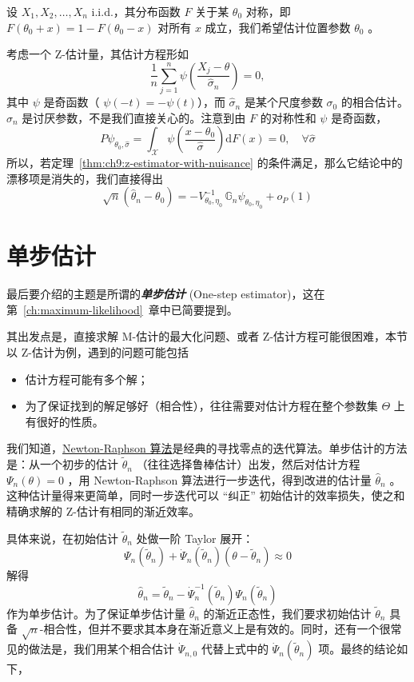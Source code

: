 \begin{example}[对称位置模型]
设 $X_1, X_2, \dots, X_n$ i.i.d.，其分布函数 $F$ 关于某 $\theta_0$ 对称，即 $F(\theta_0 + x) = 1 - F(\theta_0 - x)$ 对所有 $x$ 成立，我们希望估计位置参数 $\theta_0$ 。

考虑一个 Z-估计量，其估计方程形如\[\frac{1}{n} \sum_{j=1}^n \psi\!\left( \frac{X_j - \theta}{\widehat{\sigma}_n} \right) = 0,\]
其中 $\psi$ 是奇函数（ $\psi(-t) = -\psi(t)$），而 $\widehat{\sigma}_n$ 是某个尺度参数 $\sigma_0$ 的相合估计。$\widehat{\sigma}_n$ 是讨厌参数，不是我们直接关心的。注意到由 $F$ 的对称性和 $\psi$ 是奇函数， \[ P\psi_{\theta_0,\widehat\sigma}=\int_{\mathscr X}\psi\left(\frac{x-\theta_0}{\widehat\sigma}\right)\mathrm{d}F(x)=0,\quad \forall \widehat\sigma \]所以，若定理~\ref{thm:ch9:z-estimator-with-nuisance} 的条件满足，那么它结论中的漂移项是消失的，我们直接得出\[\sqrt{n}(\widehat{\theta}_n - \theta_0) = -V_{\theta_0,\eta_0}^{-1}\,\mathbb{G}_n \psi_{\theta_0,\eta_0} + o_P(1)\]

\end{example}

\section{单步估计}

最后要介绍的主题是所谓的\textbf{\emph{单步估计}} (One-step estimator)，这在第~\ref{ch:maximum-likelihood}~章中已简要提到。

其出发点是，直接求解 M-估计的最大化问题、或者 Z-估计方程可能很困难，本节以 Z-估计为例，遇到的问题可能包括

\begin{itemize}
\tightlist
\item
  估计方程可能有多个解；
\item
  为了保证找到的解足够好（相合性），往往需要对估计方程在整个参数集 $\Theta$ 上有很好的性质。
\end{itemize}

我们知道，\href{https://en.wikipedia.org/wiki/Newton\%27s_method}{Newton-Raphson 算法}是经典的寻找零点的迭代算法。单步估计的方法是：从一个初步的估计 $\widetilde\theta_n$ （往往选择鲁棒估计）出发，然后对估计方程 $\Psi_n(\theta)=0$ ，用 Newton-Raphson 算法进行一步迭代，得到改进的估计量 $\widehat\theta_n$ 。这种估计量得来更简单，同时一步迭代可以 ``纠正'' 初始估计的效率损失，使之和精确求解的 Z-估计有相同的渐近效率。

具体来说，在初始估计 $\widetilde{\theta}_n$ 处做一阶 Taylor 展开：\[\Psi_n(\widetilde{\theta}_n) + \dot{\Psi}_n(\widetilde{\theta}_n)(\theta - \widetilde{\theta}_n) \approx 0\]
解得\[\widehat{\theta}_n = \widetilde{\theta}_n - \dot{\Psi}_n^{-1}(\widetilde{\theta}_n) \Psi_n(\widetilde{\theta}_n)\]
作为单步估计。为了保证单步估计量 $\widehat\theta_n$ 的渐近正态性，我们要求初始估计 $\widetilde\theta_n$ 具备 $\sqrt n$-相合性，但并不要求其本身在渐近意义上是有效的。同时，还有一个很常见的做法是，我们用某个相合估计 $\dot{\Psi}_{n,0}$ 代替上式中的 $\dot{\Psi}_n(\widetilde{\theta}_n)$ 项。最终的结论如下，

